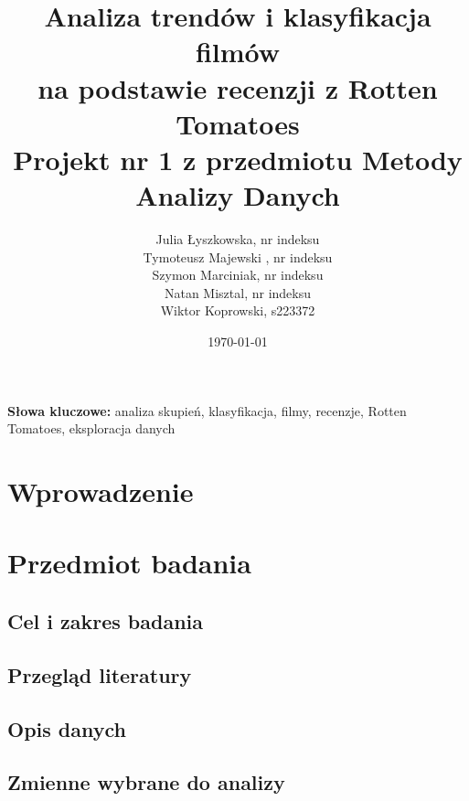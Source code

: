 \documentclass[a4paper,12pt]{article}
\title{Analiza trendów i klasyfikacja filmów\\na podstawie recenzji z Rotten Tomatoes\\\large Projekt nr 1 z przedmiotu Metody Analizy Danych}
\author{Julia Łyszkowska, nr indeksu\\Tymoteusz Majewski , nr indeksu\\Szymon Marciniak, nr indeksu\\Natan Misztal, nr indeksu\\Wiktor Koprowski, s223372}
\date{\today}
\begin{document}
\maketitle

\begin{abstract}
\end{abstract}

\noindent \textbf{Słowa kluczowe:} analiza skupień, klasyfikacja, filmy, recenzje, Rotten Tomatoes, eksploracja danych

\section{Wprowadzenie}

\section{Przedmiot badania}

\subsection{Cel i zakres badania}

\subsection{Przegląd literatury}

\subsection{Opis danych}

\subsection{Zmienne wybrane do analizy}
\end{document}
